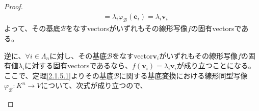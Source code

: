 \documentclass[dvipdfmx]{jsarticle}
\begin{document}
\begin{proof}
\begin{align*}
&= \lambda_{i}\varphi_{\mathcal{B}}\left( \mathbf{e}_{i} \right) = \lambda_{i}\mathbf{v}_{i}
\end{align*}
よって、その基底$\mathcal{B}$をなすvectorsがいずれもその線形写像$f$の固有vectorsである。\par
逆に、$\forall i \in \varLambda_{n}$に対し、その基底$\mathcal{B}$をなすvector$\mathbf{v}_{i}$がいずれもその線形写像$f$の固有値$\lambda_{i}$に対する固有vectorsであるなら、$f\left( \mathbf{v}_{i} \right) = \lambda_{i}\mathbf{v}_{i}$が成り立つことになる。ここで、定理\ref{2.1.5.1}よりその基底$\mathcal{B}$に関する基底変換における線形同型写像$\varphi_{\mathcal{B}}:K^{n} \rightarrow V$について、次式が成り立つので、
\begin{center}
\end{center}
\end{proof}
\end{document}
